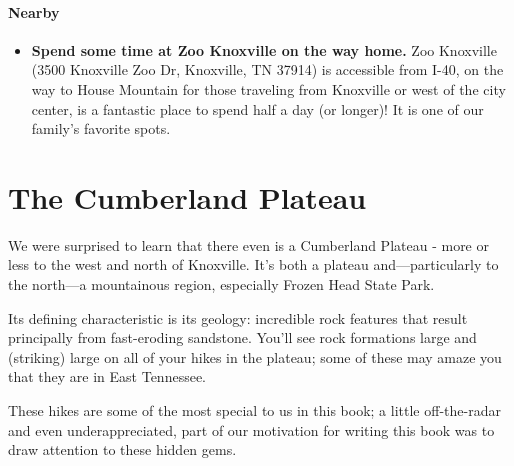 \documentclass[
  letterpaper,
  DIV=11,
  numbers=noendperiod]{scrreprt}
\providecommand{\tightlist}{%
  \setlength{\itemsep}{0pt}\setlength{\parskip}{0pt}}\usepackage{longtable,booktabs,array}
\begin{document}
\subsection{Nearby}\label{nearby-11}

\begin{itemize}
\tightlist
\item
  \textbf{Spend some time at Zoo Knoxville on the way home.} Zoo
  Knoxville (3500 Knoxville Zoo Dr, Knoxville, TN 37914) is accessible
  from I-40, on the way to House Mountain for those traveling from
  Knoxville or west of the city center, is a fantastic place to spend
  half a day (or longer)! It is one of our family's favorite spots.
\end{itemize}

\part{The Cumberland Plateau}

We were surprised to learn that there even is a Cumberland Plateau -
more or less to the west and north of Knoxville. It's both a plateau
and---particularly to the north---a mountainous region, especially
Frozen Head State Park.

Its defining characteristic is its geology: incredible rock features
that result principally from fast-eroding sandstone. You'll see rock
formations large and (striking) large on all of your hikes in the
plateau; some of these may amaze you that they are in East Tennessee.

These hikes are some of the most special to us in this book; a little
off-the-radar and even underappreciated, part of our motivation for
writing this book was to draw attention to these hidden gems.
\end{document}
